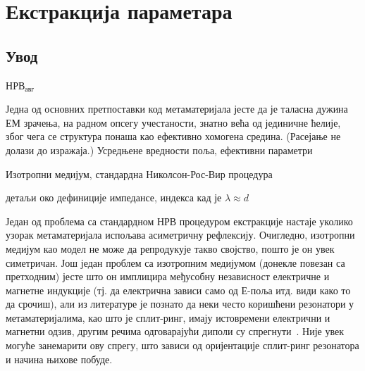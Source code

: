 




\newcommand{\sirina}{\columnwidth}
\newcommand{\sirinab}{\columnwidth}
\newcommand{\sirinac}{0.48\columnwidth}
\newcommand{\SkalaA}{0.3}
\newcommand{\SkalaB}{0.3}
\newcommand{\SkalaC}{0.3}
\newcommand{\subscript}[1]{\ensuremath{_{\textrm{#1}}}}




%
\newcommand{\ga}{\Gamma\Pi}

\chapter{Екстракција параметара}

\section{Увод}

$НРВ_{авг}$

Једна од основних претпоставки код метаматеријала јесте да је таласна дужина ЕМ зрачења, на радном опсегу учестаности, знатно већа од јединичне ћелије, због чега се структура понаша као ефективно хомогена средина. (Расејање не долази до изражаја.) Усредњене вредности поља, ефективни параметри

Изотропни медијум, стандардна Николсон-Рос-Вир процедура~\cite{Nicol:70,Weir:74,Smith:02,Markos:03}

детаљи око дефиниције импедансе, индекса кад је $\lambda \approx d$

Један од проблема са стандардном НРВ процедуром екстракције настаје уколико узорак метаматеријала испољава асиметричну рефлексију. Очигледно, изотропни медијум као модел не може да репродукује такво својство, пошто је он увек симетричан. Још један проблем са изотропним медијумом (донекле повезан са претходним) јесте што он имплицира међусобну независност електричне и магнетне индукције (тј. да електрична зависи само од Е-поља итд. види како то да срочиш), али из литературе је познато да неки често коришћени резонатори у метаматеријалима, као што је сплит-ринг, имају истовремени електрични и магнетни одзив, другим речима одговарајући диполи су спрегнути~\cite{marques}. Није увек могуће занемарити ову спрегу, што зависи од оријентације сплит-ринг резонатора и начина њихове побуде.


